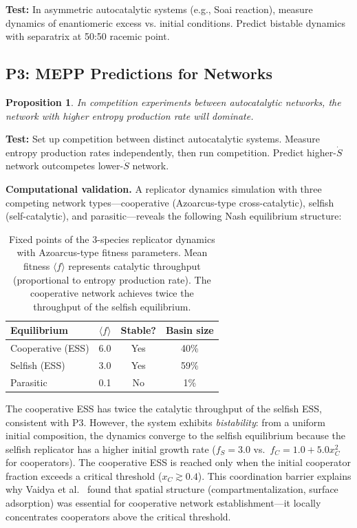 \documentclass[12pt,a4paper]{article}
\newtheorem{proposition}{Proposition}
\theoremstyle{remark}
\begin{document}
\textbf{Test:} In asymmetric autocatalytic systems (e.g., Soai reaction), measure dynamics of enantiomeric excess vs. initial conditions. Predict bistable dynamics with separatrix at 50:50 racemic point.

\subsection{P3: MEPP Predictions for Networks}

\begin{proposition}
In competition experiments between autocatalytic networks, the network with higher entropy production rate will dominate.
\end{proposition}

\textbf{Test:} Set up competition between distinct autocatalytic systems. Measure entropy production rates independently, then run competition. Predict higher-$\dot{S}$ network outcompetes lower-$\dot{S}$ network.

\textbf{Computational validation.} A replicator dynamics simulation with three competing network types---cooperative (Azoarcus-type cross-catalytic), selfish (self-catalytic), and parasitic---reveals the following Nash equilibrium structure:

\begin{table}[ht]
\centering
\caption{Fixed points of the 3-species replicator dynamics with Azoarcus-type fitness parameters. Mean fitness $\langle f \rangle$ represents catalytic throughput (proportional to entropy production rate). The cooperative network achieves twice the throughput of the selfish equilibrium.}
\label{tab:replicator-fps}
\begin{tabular}{lccc}
\toprule
\textbf{Equilibrium} & $\langle f \rangle$ & \textbf{Stable?} & \textbf{Basin size} \\
\midrule
Cooperative (ESS) & 6.0 & Yes & 40\% \\
Selfish (ESS) & 3.0 & Yes & 59\% \\
Parasitic & 0.1 & No & 1\% \\
\bottomrule
\end{tabular}
\end{table}

The cooperative ESS has twice the catalytic throughput of the selfish ESS, consistent with P3. However, the system exhibits \emph{bistability}: from a uniform initial composition, the dynamics converge to the selfish equilibrium because the selfish replicator has a higher initial growth rate ($f_S = 3.0$ vs.\ $f_C = 1.0 + 5.0 x_C^2$ for cooperators). The cooperative ESS is reached only when the initial cooperator fraction exceeds a critical threshold ($x_C \gtrsim 0.4$). This coordination barrier explains why Vaidya et al.\ \citep{AzoarcusPNAS} found that spatial structure (compartmentalization, surface adsorption) was essential for cooperative network establishment---it locally concentrates cooperators above the critical threshold.
\end{document}
